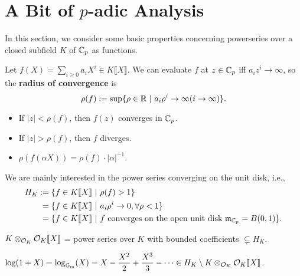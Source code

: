 \section{\texorpdfstring{A Bit of $p$-adic Analysis}{}}
In this section, we consider some basic properties concerning powerseries over a closed subfield $K$ of $\mathbb{C}_p$ as functions.

Let $f(X) = \sum_{i\ge 0} a_iX^i\in K\llbracket X\rrbracket $. We can evaluate $f$ at $z\in \mathbb{C}_p$ iff $a_iz^i\to\infty$, so the \textbf{radius of convergence}
is \[\rho(f) := \sup\{\rho\in\mathbb{R}\ |\ a_i\rho^i\to\infty (i\to\infty)\}.\]
\begin{itemize}
    \item If $|z| < \rho(f)$, then $f(z)$ converges in $\mathbb{C}_p$.
    \item If $|z| > \rho(f)$, then $f$ diverges.
    \item $\rho(f(\alpha X)) = \rho(f)\cdot |\alpha|^{-1}$.
\end{itemize}
We are mainly interested in the power series converging on the unit disk, i.e., \begin{align*}
    H_K :={}& \{f\in K\llbracket X\rrbracket\ |\ \rho(f) > 1\}\\
    ={}&  \{f\in K\llbracket X\rrbracket\ |\ a_i\rho^i\to 0, \forall \rho < 1\}\\
    ={}&  \{f\in K\llbracket X\rrbracket\ |\ f\text{ converges on the open unit disk }\mathfrak{m}_{\mathbb{C}_p} = B(0, 1)\}.
\end{align*}
\begin{example}
    $K\otimes_{\mathcal{O}_K}\mathcal{O}_K\llbracket X\rrbracket$ = power series over $K$ with bounded coefficients $\subsetneq H_K$.
\end{example}
\begin{example}
    $\log(1 + X) = \log_{\mathbb{G}_{\mathrm{m}}}(X) = X - \displaystyle\frac{X^2}{2} + \frac{X^3}{3} - \dots\in H_K\setminus K\otimes_{\mathcal{O}_K}\mathcal{O}_K\llbracket X\rrbracket$.
\end{example}

